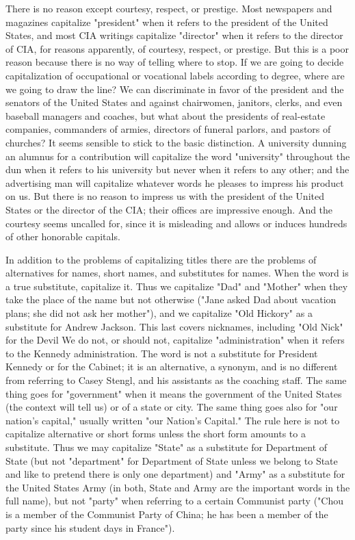 \documentclass[
    oneside,
    11pt,
    draft
]{memoir}
\begin{document}
There is no reason except courtesy, respect, or prestige. Most newspapers and magazines capitalize "president" when it refers to the president of the United States, and most CIA writings capitalize "director" when it refers to the director of CIA, for reasons apparently, of courtesy, respect, or prestige. But this is a poor reason because there is no way of telling where to stop. If we are going to decide capitalization of occupational or vocational labels according to degree, where are we going to draw the line? We can discriminate in favor of the president and the senators of the United States and against chairwomen, janitors, clerks, and even baseball managers and coaches, but what about the presidents of real-estate companies, commanders of armies, directors of funeral parlors, and pastors of churches? It seems sensible to stick to the basic distinction. A university dunning an alumnus for a contribution will capitalize the word "university" throughout the dun when it refers to his university but never when it refers to any other; and the advertising man will capitalize whatever words he pleases to impress his product on us. But there is no reason to impress us with the president of the United States or the director of the CIA; their offices are impressive enough. And the courtesy seems uncalled for, since it is misleading and allows or induces hundreds of other honorable capitals.

In addition to the problems of capitalizing titles there are the problems of alternatives for names, short names, and substitutes for names. When the word is a true substitute, capitalize it. Thus we capitalize "Dad" and "Mother" when they take the place of the name but not otherwise ("Jane asked Dad about vacation plans; she did not ask her mother"), and we capitalize "Old Hickory" as a substitute for Andrew Jackson. This last covers nicknames, including "Old Nick" for the Devil We do not, or should not, capitalize "administration" when it refers to the Kennedy administration. The word is not a substitute for President Kennedy or for the Cabinet; it is an alternative, a synonym, and is no different from referring to Casey Stengl, and his assistants as the coaching staff. The same thing goes for "government" when it means the government of the United States (the context will tell us) or of a state or city. The same thing goes also for "our nation's capital," usually written "our Nation's Capital." The rule here is not to capitalize alternative or short forms unless the short form amounts to a substitute. Thus we may capitalize "State" as a substitute for Department of State (but not "department" for Department of State unless we belong to State and like to pretend there is only one department) and "Army" as a substitute for the United States Army (in both, State and Army are the important words in the full name), but not "party" when referring to a certain Communist party ("Chou is a member of the Communist Party of China; he has been a member of the party since his student days in France").
\end{document}
